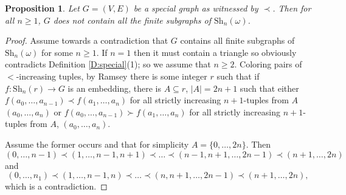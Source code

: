 \documentclass[a4paper]{amsart}
\theoremstyle{plain}
\newtheorem{proposition}[theorem]{Proposition}
\newtheorem{fact}[theorem]{Fact}
\theoremstyle{definition}
\theoremstyle{remark}
\numberwithin{equation}{section}
\newcommand{\Sh}{\text{Sh}}
\begin{document}
\begin{proposition}\label{P:special has no shift}\cite[Theorem 4]{HK}
Let $G=(V,E)$ be a special graph as witnessed by $\prec $. Then for all $n\geq 1$, $G$ does not contain all the finite subgraphs of $\Sh_n(\omega)$.
\end{proposition}
\begin{proof}
Assume towards a contradiction that $G$ contains all finite subgraphs of $\Sh_n(\omega)$ for some $n\geq 1$. If $n=1$ then it must contain a triangle so obviously contradicts Definition \ref{D:special}(1); so we assume that $n\geq 2$. Coloring pairs of $<$-increasing tuples, by Ramsey there is some integer $r$ such that if $f:\Sh_n(r)\to G$ is an embedding, there is $A\subseteq r$, $|A|=2n+1$ such that either $f(a_0,\dots,a_{n-1})\prec f(a_1,\dots,a_n)$ for all strictly increasing $n+1$-tuples from $A$ $(a_0,\dots,a_n)$ or $f(a_0,\dots,a_{n-1})\succ f(a_1,\dots,a_n)$ for all strictly increasing $n+1$-tuples from $A$, $(a_0,\dots,a_n)$. 

Assume the former occurs and that for simplicity $A=\{0,\dots,2n\}$. Then
\[(0,\dots,n-1)\prec (1,\dots,n-1,n+1)\prec\dots\prec (n-1,n+1,\dots, 2n-1)\prec (n+1,\dots,2n)\]
and
\[(0,\dots,n_1)\prec (1,\dots,n-1,n)\prec\dots\prec (n,n+1,\dots,2n-1)\prec (n+1,\dots,2n),\]
which is a contradiction.
\end{proof}

%
\end{document}
